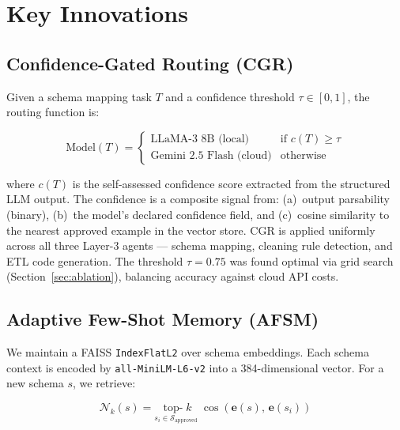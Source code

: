 \documentclass[9pt,a4paper,twocolumn,twoside]{rho-class/rho}
\begin{document}
\section{Key Innovations}
\label{sec:innovations}

    \subsection{Confidence-Gated Routing (CGR)}
    \label{sec:cgr}

        Given a schema mapping task $T$ and a confidence threshold $\tau \in [0,1]$, the routing function is:

        \begin{equation}
            \text{Model}(T) =
            \begin{cases}
                \text{LLaMA-3 8B (local)} & \text{if } c(T) \geq \tau \\
                \text{Gemini 2.5 Flash (cloud)} & \text{otherwise}
            \end{cases}
            \label{eq:cgr}
        \end{equation}

        where $c(T)$ is the self-assessed confidence score extracted from the structured LLM output. The confidence is a composite signal from: (a)~output parsability (binary), (b)~the model's declared confidence field, and (c)~cosine similarity to the nearest approved example in the vector store. CGR is applied uniformly across all three Layer-3 agents --- schema mapping, cleaning rule detection, and ETL code generation. The threshold $\tau = 0.75$ was found optimal via grid search (Section~\ref{sec:ablation}), balancing accuracy against cloud API costs.

    \subsection{Adaptive Few-Shot Memory (AFSM)}
    \label{sec:afsm}

        We maintain a FAISS \texttt{IndexFlatL2} over schema embeddings. Each schema context is encoded by \texttt{all-MiniLM-L6-v2} \cite{reimers2019sentence} into a 384-dimensional vector. For a new schema $s$, we retrieve:

        \begin{equation}
            \mathcal{N}_k(s) = \underset{s_i \in \mathcal{S}_{\text{approved}}}{\operatorname{top-}k}
            \;\cos\!\left(\mathbf{e}(s),\, \mathbf{e}(s_i)\right)
            \label{eq:afsm}
        \end{equation}
\end{document}
